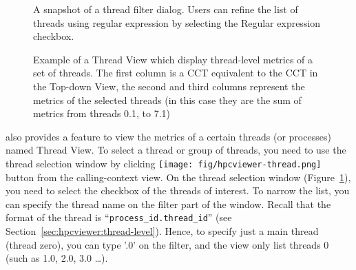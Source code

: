\begin{figure}[t]
\caption{A snapshot of a thread filter dialog. Users can refine the list of threads using regular expression by selecting the Regular expression checkbox.}
\label{fig:hpcviewer-dialog-thread-select}
\end{figure}

\begin{figure}[t]
\caption{Example of a Thread View which display thread-level metrics of a set of threads. The first column is a CCT equivalent to the CCT in the Top-down View, the second and third columns represent the metrics of the selected threads (in this case they are the sum of metrics from threads 0.1, to 7.1)}
\label{fig:hpcviewer-view-thread-level}
\end{figure}

\hpcviewer{} also provides a feature to view the metrics of a certain threads (or processes) named Thread View.
To select a thread or group of threads, you need to use the thread selection window by clicking \texttt{[image: fig/hpcviewer-thread.png]} button from the calling-context view.
On the thread selection window (Figure~\ref{fig:hpcviewer-dialog-thread-select}), you need to select the checkbox of the threads of interest. 
To  narrow the list, you can specify the thread name on the filter part of the window.
Recall that the format of the thread is ``\texttt{process\_id.thread\_id}'' (see Section~\ref{sec:hpcviewer:thread-level}).
Hence, to specify just a main thread (thread zero), you can type '.0' on the filter, and the view only list threads 0 (such as 1.0, 2.0, 3.0 \dots).

